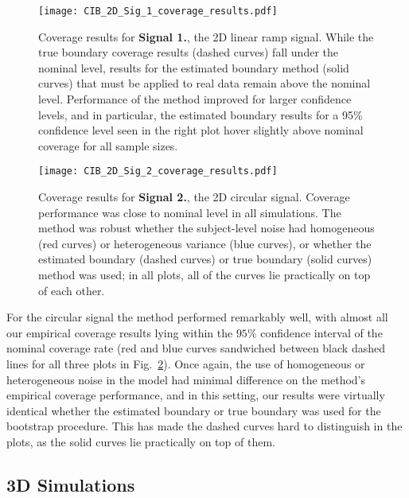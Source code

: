 \begin{figure}[htbp]
\hspace*{-1.5cm}
    \texttt{[image: CIB\_2D\_Sig\_1\_coverage\_results.pdf]}
\caption{Coverage results for \textbf{Signal 1.}, the 2D linear ramp signal. While the true boundary coverage results (dashed curves) fall under the nominal level, results for the estimated boundary method (solid curves) that must be applied to real data remain above the nominal level. Performance of the method improved for larger confidence levels, and in particular, the estimated boundary results for a 95\% confidence level seen in the right plot hover slightly above nominal coverage for all sample sizes.}
\label{fig:2D_sig_1_results}
\end{figure}

\clearpage

\begin{figure}[htbp]
\hspace*{-1.5cm}
    \texttt{[image: CIB\_2D\_Sig\_2\_coverage\_results.pdf]}
\caption{Coverage results for \textbf{Signal 2.}, the 2D circular signal. Coverage performance was close to nominal level in all simulations. The method was robust whether the subject-level noise had homogeneous (red curves) or heterogeneous variance (blue curves), or whether the estimated boundary (dashed curves) or true boundary (solid curves) method was used; in all plots, all of the curves lie practically on top of each other.}
\label{fig:2D_sig_2_results}
\end{figure}


For the circular signal the method performed remarkably well, with almost all our empirical coverage results lying within the $95\%$ confidence interval of the nominal coverage rate (red and blue curves sandwiched between black dashed lines for all three plots in Fig.\ \ref{fig:2D_sig_2_results}). Once again, the use of homogeneous or heterogeneous noise in the model had minimal difference on the method's empirical coverage performance, and in this setting, our results were virtually identical whether the estimated boundary or true boundary was used for the bootstrap procedure. This has made the dashed curves hard to distinguish in the plots, as the solid curves lie practically on top of them. 

\clearpage

\subsection{3D Simulations}
\label{sec:3D_simulation_results}

